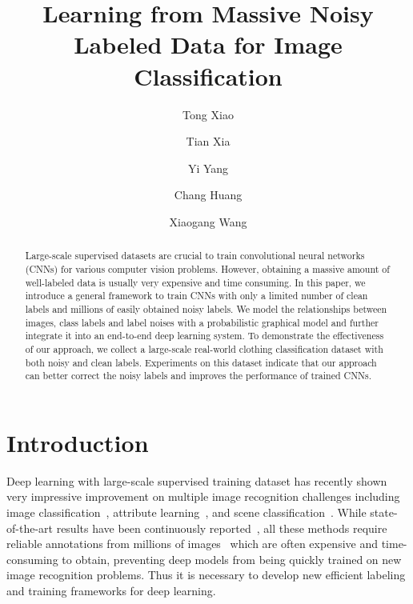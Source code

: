 \documentclass[10pt,twocolumn,letterpaper]{article}
\begin{document}
\title{Learning from Massive Noisy Labeled Data for Image Classification}
\author[1]{Tong Xiao}
\author[2]{Tian Xia}
\author[2]{Yi Yang}
\author[2]{Chang Huang}
\author[1]{Xiaogang Wang}
\renewcommand\Authands{, and }


\maketitle
\thispagestyle{empty}

\begin{abstract}
Large-scale supervised datasets are crucial to train convolutional neural networks (CNNs) for various computer vision problems. However, obtaining a massive amount of well-labeled data is usually very expensive and time consuming. In this paper, we introduce a general framework to train CNNs with only a limited number of clean labels and millions of easily obtained noisy labels. We model the relationships between images, class labels and label noises with a probabilistic graphical model and further integrate it into an end-to-end deep learning system. To demonstrate the effectiveness of our approach, we collect a large-scale real-world clothing classification dataset with both noisy and clean labels. Experiments on this dataset indicate that our approach can better correct the noisy labels and improves the performance of trained CNNs. 
\end{abstract}

\section{Introduction} %
\label{sec:introduction}

Deep learning with large-scale supervised training dataset has recently shown very impressive improvement on multiple image recognition challenges including image classification~\cite{krizhevsky2012imagenet}, attribute learning~\cite{zhang2014panda}, and scene classification~\cite{farabet2013learning}. While state-of-the-art results have been continuously reported~\cite{zeiler2013visualizing,simonyan2014very,szegedy2014going}, all these methods require reliable annotations from millions of images~\cite{deng2009imagenet} which are often expensive and time-consuming to obtain, preventing deep models from being quickly trained on new image recognition problems. Thus it is necessary to develop new efficient labeling and training frameworks for deep learning.
\end{document}
